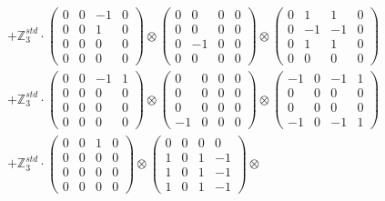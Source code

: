 \documentclass{article}
\begin{document}
{\begin{align}
        &+ \label{Rs16-Rc11-Solution-19-c22} \mathbb{Z}_3^{std} \cdot 
            \begin{pmatrix} 0 & 0 & -1 & 0 \\ 0 & 0 & 1 & 0 \\ 0 & 0 & 0 & 0 \\ 0 & 0 & 0 & 0 \end{pmatrix} \otimes 
            \begin{pmatrix} 0 & 0 & 0 & 0 \\ 0 & 0 & 0 & 0 \\ 0 & -1 & 0 & 0 \\ 0 & 0 & 0 & 0 \end{pmatrix} \otimes 
            \begin{pmatrix} 0 & 1 & 1 & 0 \\ 0 & -1 & -1 & 0 \\ 0 & 1 & 1 & 0 \\ 0 & 0 & 0 & 0 \end{pmatrix} \\ 
        &+ \label{Rs16-Rc11-Solution-19-c23} \mathbb{Z}_3^{std} \cdot 
            \begin{pmatrix} 0 & 0 & -1 & 1 \\ 0 & 0 & 0 & 0 \\ 0 & 0 & 0 & 0 \\ 0 & 0 & 0 & 0 \end{pmatrix} \otimes 
            \begin{pmatrix} 0 & 0 & 0 & 0 \\ 0 & 0 & 0 & 0 \\ 0 & 0 & 0 & 0 \\ -1 & 0 & 0 & 0 \end{pmatrix} \otimes 
            \begin{pmatrix} -1 & 0 & -1 & 1 \\ 0 & 0 & 0 & 0 \\ 0 & 0 & 0 & 0 \\ -1 & 0 & -1 & 1 \end{pmatrix} \\ 
        &+ \label{Rs16-Rc11-Solution-19-c24} \mathbb{Z}_3^{std} \cdot 
            \begin{pmatrix} 0 & 0 & 1 & 0 \\ 0 & 0 & 0 & 0 \\ 0 & 0 & 0 & 0 \\ 0 & 0 & 0 & 0 \end{pmatrix} \otimes 
            \begin{pmatrix} 0 & 0 & 0 & 0 \\ 1 & 0 & 1 & -1 \\ 1 & 0 & 1 & -1 \\ 1 & 0 & 1 & -1 \end{pmatrix} \otimes 

\end{align}}
\end{document}
